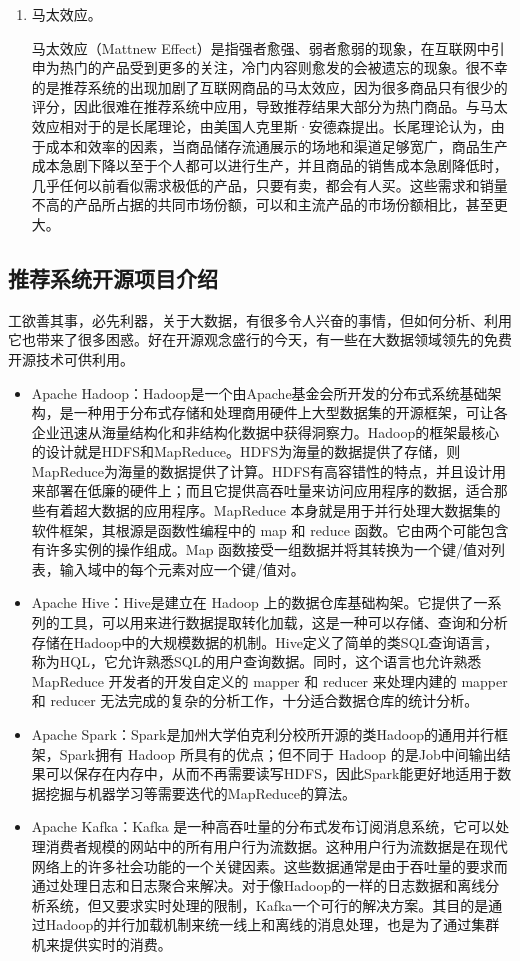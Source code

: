 \begin{enumerate}[(1)]
	\item 马太效应。

	马太效应（Mattnew Effect）是指强者愈强、弱者愈弱的现象，在互联网中引申为热门的产品受到更多的关注，冷门内容则愈发的会被遗忘的现象。很不幸的是推荐系统的出现加剧了互联网商品的马太效应，因为很多商品只有很少的评分，因此很难在推荐系统中应用，导致推荐结果大部分为热门商品。与马太效应相对于的是长尾理论，由美国人克里斯·安德森提出。长尾理论认为，由于成本和效率的因素，当商品储存流通展示的场地和渠道足够宽广，商品生产成本急剧下降以至于个人都可以进行生产，并且商品的销售成本急剧降低时，几乎任何以前看似需求极低的产品，只要有卖，都会有人买。这些需求和销量不高的产品所占据的共同市场份额，可以和主流产品的市场份额相比，甚至更大。
	\end{enumerate}

	\subsection{推荐系统开源项目介绍}
	工欲善其事，必先利器，关于大数据，有很多令人兴奋的事情，但如何分析、利用它也带来了很多困惑。好在开源观念盛行的今天，有一些在大数据领域领先的免费开源技术可供利用。
	\begin{itemize}
		\item Apache Hadoop：Hadoop是一个由Apache基金会所开发的分布式系统基础架构，是一种用于分布式存储和处理商用硬件上大型数据集的开源框架，可让各企业迅速从海量结构化和非结构化数据中获得洞察力。Hadoop的框架最核心的设计就是HDFS和MapReduce。HDFS为海量的数据提供了存储，则MapReduce为海量的数据提供了计算。HDFS有高容错性的特点，并且设计用来部署在低廉的硬件上；而且它提供高吞吐量来访问应用程序的数据，适合那些有着超大数据的应用程序。MapReduce 本身就是用于并行处理大数据集的软件框架，其根源是函数性编程中的 map 和 reduce 函数。它由两个可能包含有许多实例的操作组成。Map 函数接受一组数据并将其转换为一个键/值对列表，输入域中的每个元素对应一个键/值对。
		\item Apache Hive：Hive是建立在 Hadoop 上的数据仓库基础构架。它提供了一系列的工具，可以用来进行数据提取转化加载，这是一种可以存储、查询和分析存储在Hadoop中的大规模数据的机制。Hive定义了简单的类SQL查询语言，称为HQL，它允许熟悉SQL的用户查询数据。同时，这个语言也允许熟悉 MapReduce 开发者的开发自定义的 mapper 和 reducer 来处理内建的 mapper 和 reducer 无法完成的复杂的分析工作，十分适合数据仓库的统计分析。
		\item Apache Spark：Spark是加州大学伯克利分校所开源的类Hadoop的通用并行框架，Spark拥有 Hadoop 所具有的优点；但不同于 Hadoop 的是Job中间输出结果可以保存在内存中，从而不再需要读写HDFS，因此Spark能更好地适用于数据挖掘与机器学习等需要迭代的MapReduce的算法。
		\item Apache Kafka：Kafka 是一种高吞吐量的分布式发布订阅消息系统，它可以处理消费者规模的网站中的所有用户行为流数据。这种用户行为流数据是在现代网络上的许多社会功能的一个关键因素。这些数据通常是由于吞吐量的要求而通过处理日志和日志聚合来解决。对于像Hadoop的一样的日志数据和离线分析系统，但又要求实时处理的限制，Kafka一个可行的解决方案。其目的是通过Hadoop的并行加载机制来统一线上和离线的消息处理，也是为了通过集群机来提供实时的消费。
	\end{itemize}

